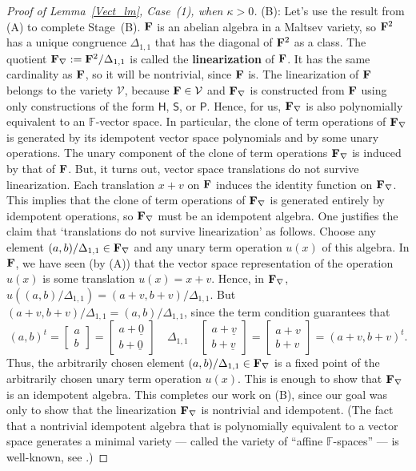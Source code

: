 \documentclass[12pt]{amsart}
\theoremstyle{definition}
\numberwithin{equation}{section}
\newcommand{\m}[1]{{\mathbf{\uppercase{#1}}}}
\begin{document}
\begin{proof}[Proof of Lemma~\ref{Vect_lm}, Case~(1), when $\kappa>0$]
(B): Let's use the result from (A) to complete Stage~(B).
$\m f$ is an abelian algebra in a Maltsev variety,
so $\m f^2$ has a unique congruence $\Delta_{1,1}$
that has the diagonal of $\m f^2$ as a class.
The quotient $\m f_{\nabla}:=\m f^2/\Delta_{1,1}$
is called the {\bf linearization} of $\m f$.
It has the same cardinality as $\m f$,
so it will be nontrivial, since $\m f$ is.
The linearization of $\m f$ belongs
to the variety $\mathcal{V}$, because $\m f\in \mathcal{V}$
and $\m f_{\nabla}$ is
constructed from $\m f$ using only constructions of the form
$\mathsf{H}$, 
$\mathsf{S}$, or
$\mathsf{P}$.
Hence, for us, $\m f_{\nabla}$ is also polynomially
equivalent to an $\mathbb{F}$-vector space.
In particular, the clone of term operations
of $\m f_{\nabla}$ is generated by
its idempotent vector space polynomials
and by some unary operations.
The unary component of the clone of term operations
$\m f_{\nabla}$ is induced by that of $\m f$.
But, it turns out, vector space
translations do not survive linearization.
Each translation $x+v$ on $\m f$
induces the identity function on 
$\m f_{\nabla}$. This implies that the
clone of term operations of
$\m f_{\nabla}$ is generated entirely
by idempotent operations,
so $\m f_{\nabla}$ must be an idempotent algebra.
One justifies the claim that
`translations do not survive linearization'
as follows. Choose any element
$(a,b)/\Delta_{1,1}\in \m f_{\nabla}$
and any unary term operation $u(x)$
of this algebra. In $\m f$, we have seen (by (A))
that the vector space representation of the
operation $u(x)$ is some translation $u(x)=x+v$.
Hence, in
$\m f_{\nabla}$, $u((a,b)/\Delta_{1,1})=(a+v,b+v)/\Delta_{1,1}$.
But $(a+v,b+v)/\Delta_{1,1} = (a,b)/\Delta_{1,1}$,
since the term condition guarantees that
\[
(a,b)^t=
\begin{bmatrix}a\\
  b
\end{bmatrix}
=
\begin{bmatrix}a+\underline{0}  \\
  b+\underline{0}
\end{bmatrix}
\quad
\Delta_{1,1}
\quad 
\begin{bmatrix}a+\underline{v}  \\
  b+\underline{v}
\end{bmatrix}
=\begin{bmatrix}a+v\\
  b+v
\end{bmatrix} = (a+v,b+v)^t.
\]
Thus, the arbitrarily chosen element
$(a,b)/\Delta_{1,1}\in \m f_{\nabla}$
is a fixed point of the arbitrarily chosen
unary term operation $u(x)$.
This is enough to show that
$\m f_{\nabla}$ is an idempotent algebra.
This completes our work on (B), since our
goal was only to show that the linearization
$\m f_{\nabla}$ is nontrivial and idempotent.
(The fact that a nontrivial idempotent algebra
that is polynomially equivalent to a vector
space generates a minimal variety --- called the variety
of ``affine $\mathbb{F}$-spaces'' --- is well-known,
see \cite{k-k-sz}.)


\end{proof}
\end{document}
